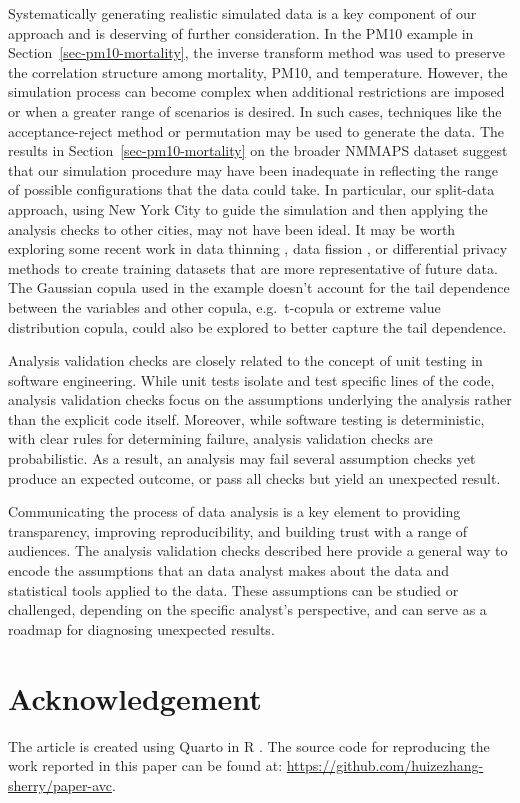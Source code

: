 \documentclass[
  12pt,
]{interact}
\begin{document}
Systematically generating realistic simulated data is a key component of
our approach and is deserving of further consideration. In the PM10
example in Section~\ref{sec-pm10-mortality}, the inverse transform
method was used to preserve the correlation structure among mortality,
PM10, and temperature. However, the simulation process can become
complex when additional restrictions are imposed or when a greater range
of scenarios is desired. In such cases, techniques like the
acceptance-reject method or permutation may be used to generate the
data. The results in Section~\ref{sec-pm10-mortality} on the broader
NMMAPS dataset suggest that our simulation procedure may have been
inadequate in reflecting the range of possible configurations that the
data could take. In particular, our split-data approach, using New York
City to guide the simulation and then applying the analysis checks to
other cities, may not have been ideal. It may be worth exploring some
recent work in data thinning \citep{neufeld2024data}, data fission
\citep{leiner2023data}, or differential privacy methods
\citep{dong_gaussian_2022} to create training datasets that are more
representative of future data. The Gaussian copula used in the example
doesn't account for the tail dependence between the variables and other
copula, e.g.~t-copula or extreme value distribution copula, could also
be explored to better capture the tail dependence.

Analysis validation checks are closely related to the concept of unit
testing in software engineering. While unit tests isolate and test
specific lines of the code, analysis validation checks focus on the
assumptions underlying the analysis rather than the explicit code
itself. Moreover, while software testing is deterministic, with clear
rules for determining failure, analysis validation checks are
probabilistic. As a result, an analysis may fail several assumption
checks yet produce an expected outcome, or pass all checks but yield an
unexpected result.

Communicating the process of data analysis is a key element to providing
transparency, improving reproducibility, and building trust with a range
of audiences. The analysis validation checks described here provide a
general way to encode the assumptions that an data analyst makes about
the data and statistical tools applied to the data. These assumptions
can be studied or challenged, depending on the specific analyst's
perspective, and can serve as a roadmap for diagnosing unexpected
results.

\section{Acknowledgement}\label{acknowledgement}

The article is created using Quarto \citep{Allaire_Quarto_2022} in R
\citep{R}. The source code for reproducing the work reported in this
paper can be found at:
\url{https://github.com/huizezhang-sherry/paper-avc}.


\renewcommand\refname{References}

\end{document}

